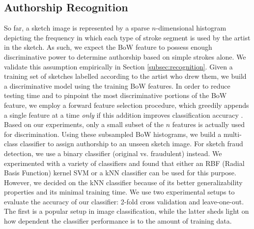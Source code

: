

\vspace{-3mm}
\subsection{Authorship Recognition}
\vspace{-1mm}
So far, a sketch image is represented by a sparse $n$-dimensional histogram depicting the frequency in which each type of stroke segment is used by the artist in the sketch. As such, we expect the BoW feature to possess enough discriminative power to determine authorship based on simple strokes alone. We validate this assumption empirically in Section \ref{subsec:recognition}. Given a training set of sketches labelled according to the artist who drew them, we build a discriminative model using the training BoW features. In order to reduce testing time and to pinpoint the most discriminative portions of the BoW feature, we employ a forward feature selection procedure, which greedily appends a single feature at a time \emph{only} if this addition improves classification accuracy \cite{574797}. Based on our experiments, only a small subset of the $n$ features is actually used for discrimination. Using these subsampled BoW histograms, we build a multi-class classifier to assign authorship to an unseen sketch image. For sketch fraud detection, we use a binary classifier (original vs. fraudulent) instead. We experimented with a variety of classifiers and found that either an RBF (Radial Basis Function) kernel SVM or a kNN classifier can be used for this purpose. However, we decided on the kNN classifier because of its better generalizability properties and its minimal training time. We use two experimental setups to evaluate the accuracy of our classifier: 2-fold cross validation and leave-one-out. The first is a popular setup in image classification, while the latter sheds light on how dependent the classifier performance is to the amount of training data.



